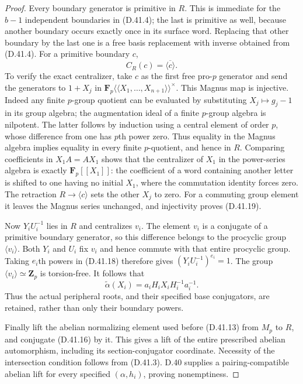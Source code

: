 \begin{proof}
Every boundary generator is primitive in
\(R\).  This is immediate for the
\(b-1\) independent boundaries in
\textup{(D.41.4)}; the last is primitive
as well, because another boundary
occurs exactly once in its surface word.
Replacing that other boundary by the
last one is a free basis replacement
with inverse obtained from
\textup{(D.41.4)}.
For a primitive boundary \(c\),
\[
                            C_R(c)=\overline{\langle c\rangle}.
 \tag{D.41.19}
\]
To verify the exact centralizer, take
\(c\) as the first free pro-\(p\)
generator and send the generators
to \(1+X_j\) in
\(\mathbf F_p\langle\!\langle X_1,\ldots,X_{n+1}\rangle\!\rangle^\times\).
This Magnus map is injective.
Indeed any finite \(p\)-group quotient
can be evaluated by substituting
\(X_j\mapsto g_j-1\) in its group algebra;
the augmentation ideal of a finite
\(p\)-group algebra is nilpotent.
The latter follows by induction using
a central element of order \(p\),
whose difference from one has \(p\)th
power zero.
Thus equality in the Magnus algebra
implies equality in every finite
\(p\)-quotient, and hence in \(R\).
Comparing coefficients in
\(X_1A=AX_1\) shows that the centralizer
of \(X_1\) in the power-series algebra
is exactly \(\mathbf F_p[[X_1]]\):
the coefficient of a word containing
another letter is shifted to one
having no initial \(X_1\), where the
commutation identity forces zero.
The retraction \(R\to\langle c\rangle\)
sets the other \(X_j\) to zero.
For a commuting group element it
leaves the Magnus series unchanged,
and injectivity proves
\textup{(D.41.19)}.

Now \(Y_iU_i^{-1}\) lies in \(R\)
and centralizes \(v_i\).
The element \(v_i\) is a conjugate
of a primitive boundary generator,
so this difference belongs to
the procyclic group \(\langle v_i\rangle\).
Both \(Y_i\) and \(U_i\) fix \(v_i\)
and hence commute with that entire
procyclic group.
Taking \(e_i\)th powers in
\textup{(D.41.18)} therefore gives
\((Y_iU_i^{-1})^{e_i}=1\).
The group \(\langle v_i\rangle\simeq
\mathbf Z_p\) is torsion-free.
It follows that
\[
                 \widetilde\alpha(X_i)
                    =a_iH_iX_iH_i^{-1}a_i^{-1}.
 \tag{D.41.20}
\]
Thus the actual peripheral roots,
and their specified base conjugators,
are retained, rather than only their
boundary powers.

Finally lift the abelian normalizing
element used before \textup{(D.41.13)}
from \(M_p\) to \(R\), and conjugate
\textup{(D.41.16)} by it.
This gives a lift of the entire
prescribed abelian automorphism,
including its section-conjugator
coordinate.
Necessity of the intersection condition
follows from \textup{(D.41.3)}.
D.40 supplies a pairing-compatible
abelian lift for every specified
\((\alpha,h_i)\), proving nonemptiness.


\end{proof}
